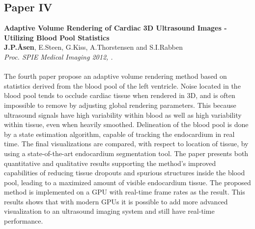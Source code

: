 \subsection{Paper IV}
\textbf{Adaptive Volume Rendering of Cardiac 3D Ultrasound Images - Utilizing Blood Pool Statistics}\\
\textbf{J.\:P.\:\AA{}sen}, E.\:Steen, G.\:Kiss, A.\:Thorstensen and S.\:I.\:Rabben\\
{\it Proc. SPIE Medical Imaging 2012, .}\\\\
The fourth paper propose an adaptive volume rendering method based on statistics derived from the blood pool of the left ventricle. Noise located in the blood pool tends to occlude cardiac tissue when rendered in 3D, and is often impossible to remove by adjusting global rendering parameters. This because ultrasound signals have high variability within blood as well as high variability within tissue, even when heavily smoothed. Delineation of the blood pool is done by a state estimation algorithm, capable of tracking the endocardium in real time. The final visualizations are compared, with respect to location of tissue, by using a state-of-the-art endocardium segmentation tool. The paper presents both quantitative and qualitative results supporting the method's improved capabilities of reducing tissue dropouts and spurious structures inside the blood pool, leading to a maximized amount of visible endocardium tissue. The proposed method is implemented on a GPU with real-time frame rates as the result. This results shows that with modern GPUs it is possible to add more advanced visualization to an ultrasound imaging system and still have real-time performance.

